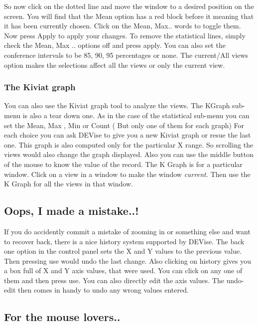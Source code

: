 	So now click on the dotted line and move the window to a desired position on the screen. You will find that the Mean option has a red block before it meaning that it has been currently chosen. Click on the Mean, Max.. words to toggle them. Now press Apply to apply your changes. To remove the statistical lines, simply check the Mean, Max .. options off and press apply. You can also set the conference intervals to be 85, 90, 95 percentages or none. The current/All views option makes the selections affect all the views or only the current view.


\subsubsection{The Kiviat graph}

	
	You can also use the Kiviat graph tool to analyze the views. The KGraph sub-menu is also a tear down one. As in the case of the statistical sub-menu you can set the Mean, Max , Min or Count ( But only one of them for each graph) For each choice you can ask DEVise to give you a new Kiviat graph or resue the last one. This graph is also computed only for the particular X range. So scrolling the views would also change the graph displayed. Also you can use the middle button of the mouse to know the value of the record. The K Graph is for a particular window. Click on a view in a window to make the window {\em current.}  Then use the K Graph for all the views in that window. 


\subsection{Oops, I made a mistake..!}


	
	If you do accidently commit a mistake of zooming in or something else and want to recover back, there is a nice history system supported by DEVise. The back one option in the control panel sets the X and Y values to the previous value. Then pressing use would undo the last change. Also clicking on history gives you a box full of X and Y axis values, that were used. You can click on any one of them and then press use. You can also directly edit the axis values. The undo-edit then comes in handy to undo any wrong values entered. 



\subsection{For the mouse lovers..}

